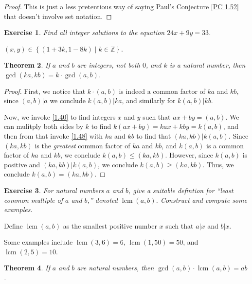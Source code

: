 \documentclass{article}
\DeclareMathOperator{\lcm}{lcm}
\newtheorem{thm}{Theorem}[section]
\newtheorem{ex}[thm]{Exercise}
\numberwithin{equation}{thm}
\begin{document}
\begin{proof}
  This is just a less pretentious way of saying Paul's Conjecture \ref{PC 1.52} that doesn't involve set notation.
\end{proof}



\begin{ex} \label{1.54}
  Find all integer solutions to the equation $24x + 9y = 33$.
\end{ex}

$(x, y) \in \left\{(1+3k, 1-8k) \mid k \in \mathbb{Z} \right\}$.



\begin{thm} \label{1.55}
  If $a$ and $b$ are integers, not both $0$, and $k$ is a natural number, then $\gcd (ka, kb) = k \cdot \gcd (a, b)$.
\end{thm}

\begin{proof}
  First, we notice that $k \cdot (a, b)$ is indeed a common factor of $ka$ and $kb$, since $(a,b) | a$ we conclude $k(a, b) | ka$, and similarly for $k(a, b) | kb$.

  Now, we invoke \ref{1.40} to find integers $x$ and $y$ such that $ax + by = (a,b)$. We can mulitply both sides by $k$ to find $k(ax+by) = kax + kby = k(a,b)$, and then from that invoke \ref{1.48} with $ka$ and $kb$ to find that $(ka, kb) | k(a,b)$. Since $(ka,kb)$ is the \emph{greatest} common factor of $ka$ and $kb$, and $k(a,b)$ is a common factor of $ka$ and $kb$, we conclude $k(a,b) \leq (ka, kb)$.
  However, since $k(a,b)$ is positive and $(ka,kb) | k(a,b)$, we conclude $k(a,b) \geq (ka, kb)$. Thus, we conclude $k(a,b) = (ka, kb)$.
\end{proof}



\begin{ex} \label{1.56}
  For natural numbers $a$ and $b$, give a suitable defintion for ``least common multiple of $a$ and $b$,'' denoted $\lcm (a,b)$. Construct and compute some examples.
\end{ex}

Define $\lcm (a, b)$ as the smallest positive number $x$ such that $a | x$ and $b | x$.

Some examples include $\lcm (3, 6) = 6$, $\lcm (1, 50) = 50$, and $\lcm(2, 5) = 10$.



\begin{thm} \label{1.57}
  If $a$ and $b$ are natural numbers, then $\gcd (a, b) \cdot \lcm (a, b) = ab$.
\end{thm}
\end{document}
